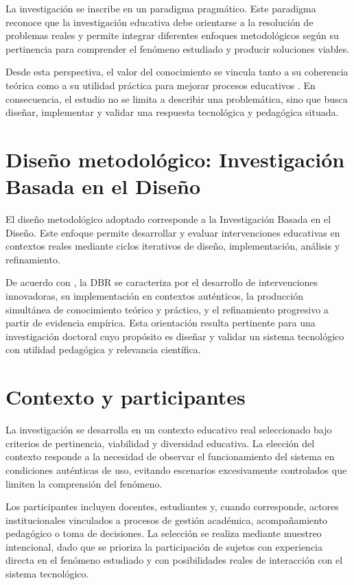 \begin{refsection}
La investigación se inscribe en un paradigma pragmático. Este paradigma reconoce que la investigación educativa debe orientarse a la resolución de problemas reales y permite integrar diferentes enfoques metodológicos según su pertinencia para comprender el fenómeno estudiado y producir soluciones viables.

Desde esta perspectiva, el valor del conocimiento se vincula tanto a su coherencia teórica como a su utilidad práctica para mejorar procesos educativos \parencite{biesta2010}. En consecuencia, el estudio no se limita a describir una problemática, sino que busca diseñar, implementar y validar una respuesta tecnológica y pedagógica situada.

\section{Diseño metodológico: Investigación Basada en el Diseño}

El diseño metodológico adoptado corresponde a la Investigación Basada en el Diseño. Este enfoque permite desarrollar y evaluar intervenciones educativas en contextos reales mediante ciclos iterativos de diseño, implementación, análisis y refinamiento.

De acuerdo con \textcite{wang2005}, la DBR se caracteriza por el desarrollo de intervenciones innovadoras, su implementación en contextos auténticos, la producción simultánea de conocimiento teórico y práctico, y el refinamiento progresivo a partir de evidencia empírica. Esta orientación resulta pertinente para una investigación doctoral cuyo propósito es diseñar y validar un sistema tecnológico con utilidad pedagógica y relevancia científica.

\section{Contexto y participantes}

La investigación se desarrolla en un contexto educativo real seleccionado bajo criterios de pertinencia, viabilidad y diversidad educativa. La elección del contexto responde a la necesidad de observar el funcionamiento del sistema en condiciones auténticas de uso, evitando escenarios excesivamente controlados que limiten la comprensión del fenómeno.

Los participantes incluyen docentes, estudiantes y, cuando corresponde, actores institucionales vinculados a procesos de gestión académica, acompañamiento pedagógico o toma de decisiones. La selección se realiza mediante muestreo intencional, dado que se prioriza la participación de sujetos con experiencia directa en el fenómeno estudiado y con posibilidades reales de interacción con el sistema tecnológico.


\end{refsection}
